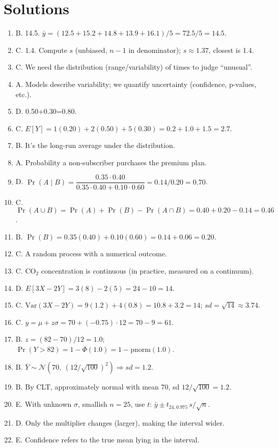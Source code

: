 \documentclass{article}
\begin{document}
\section*{Solutions}
\begin{enumerate}
\item B. 14.5. $\bar y=(12.5+15.2+14.8+13.9+16.1)/5=72.5/5=14.5$.
\item C. 1.4. Compute $s$ (unbiased, $n-1$ in denominator); $s\approx 1.37$, closest is 1.4.
\item C. We need the distribution (range/variability) of times to judge “unusual”.
\item A. Models describe variability; we quantify uncertainty (confidence, p-values, etc.).
\item D. 0.50+0.30=0.80.
\item C. $E[Y]=1(0.20)+2(0.50)+5(0.30)=0.2+1.0+1.5=2.7$.
\item B. It’s the long-run average under the distribution.
\item A. Probability a non-subscriber purchases the premium plan.
\item D. $\Pr(A\mid B)=\dfrac{0.35\cdot 0.40}{0.35\cdot 0.40+0.10\cdot 0.60}=0.14/0.20=0.70$.
\item C. $\Pr(A\cup B)=\Pr(A)+\Pr(B)-\Pr(A\cap B)=0.40+0.20-0.14=0.46$.
\item B. $\Pr(B)=0.35(0.40)+0.10(0.60)=0.14+0.06=0.20$.
\item C. A random process with a numerical outcome.
\item C. CO$_2$ concentration is continuous (in practice, measured on a continuum).
\item D. $E[3X-2Y]=3(8)-2(5)=24-10=14$.
\item C. $\mathrm{Var}(3X-2Y)=9(1.2)+4(0.8)=10.8+3.2=14$; $sd=\sqrt{14}\approx 3.74$.
\item C. $y=\mu+z\sigma=70+(-0.75)\cdot 12=70-9=61$.
\item B. $z=(82-70)/12=1.0$; $\Pr(Y>82)=1-\Phi(1.0)= 1 - \text{pnorm}(1.0)$.
\item B. $\bar Y\sim\mathcal N(70,\ (12/\sqrt{100})^2) \Rightarrow sd =1.2$.
\item B. By CLT, approximately normal with mean 70, sd $12/\sqrt{100}=1.2$.
\item E. With unknown $\sigma$, smallish $n=25$, use $t$: $\bar y \pm t_{24,0.975}\,s/\sqrt n$.
\item D. Only the multiplier changes (larger), making the interval wider.
\item E. Confidence refers to the true mean lying in the interval.

\end{enumerate}
\end{document}

